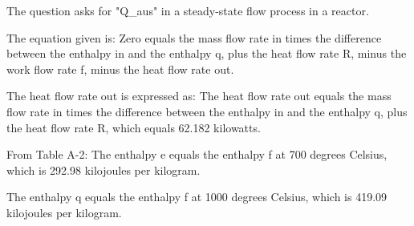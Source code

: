 The question asks for "Q_aus" in a steady-state flow process in a reactor.

The equation given is:
Zero equals the mass flow rate in times the difference between the enthalpy in and the enthalpy q, plus the heat flow rate R, minus the work flow rate f, minus the heat flow rate out.

The heat flow rate out is expressed as:
The heat flow rate out equals the mass flow rate in times the difference between the enthalpy in and the enthalpy q, plus the heat flow rate R, which equals 62.182 kilowatts.

From Table A-2:
The enthalpy e equals the enthalpy f at 700 degrees Celsius, which is 292.98 kilojoules per kilogram.

The enthalpy q equals the enthalpy f at 1000 degrees Celsius, which is 419.09 kilojoules per kilogram.